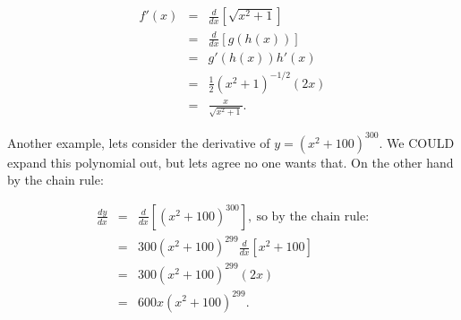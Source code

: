 \documentclass[10pt]{article}
\theoremstyle{definition}
\begin{document}
\begin{eqnarray*}
f'(x)&=&\frac{d}{dx}[\sqrt{x^2+1}]\\
&=&\frac{d}{dx}[g(h(x))]\\
&=&g'(h(x))h'(x)\\
&=&\frac{1}{2}(x^2+1)^{-1/2}(2x)\\
&=&\frac{x}{\sqrt{x^2+1}}.
\end{eqnarray*}


Another example, lets consider the derivative of $y=(x^2+100)^{300}$.  We COULD expand this polynomial out, but lets agree no one wants that.  On the other hand by the chain rule:

\begin{eqnarray*}
\frac{dy}{dx}&=&\frac{d}{dx}[(x^2+100)^{300}],\ \text{so by the chain rule:}\\
&=&300(x^2+100)^{299}\frac{d}{dx}[x^2+100]\\
&=&300(x^2+100)^{299}(2x)\\
&=&600x(x^2+100)^{299}.
\end{eqnarray*}
\end{document}
